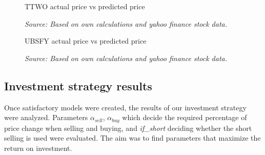 \documentclass[review]{elsarticle} %
\begin{document}
\begin{figure}[H]
\caption{TTWO actual price vs predicted price}
\begin{adjustbox}{width=1.3\textwidth,center}

\end{adjustbox}
\caption*{\textit{Source: Based on own calculations and yahoo finance stock data.}}
\end{figure}

\begin{figure}[H]
\caption{UBSFY actual price vs predicted price}
\begin{adjustbox}{width=1.3\textwidth,center}

\end{adjustbox}
\caption*{\textit{Source: Based on own calculations and yahoo finance stock data.}}
\end{figure}

\subsection{Investment strategy results}
Once satisfactory models were created, the results of our investment strategy were analyzed. Parameters  $\alpha_{sell}$, $\alpha_{buy}$  which decide the required percentage of price change when selling and buying, and \textit{if\_short} deciding whether the short selling is used were evaluated. The aim was to find parameters that maximize the return on investment.
\end{document}
